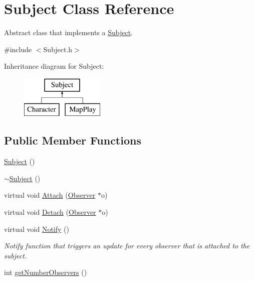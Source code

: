 \hypertarget{class_subject}{}\section{Subject Class Reference}
\label{class_subject}


Abstract class that implements a \hyperlink{class_subject}{Subject}.  




{\ttfamily \#include $<$Subject.\+h$>$}

Inheritance diagram for Subject\+:\begin{figure}[H]
\begin{center}
\leavevmode
\includegraphics[height=2.000000cm]{class_subject}
\end{center}
\end{figure}
\subsection*{Public Member Functions}
\begin{DoxyCompactItemize}
\item 
\hyperlink{class_subject_ab468044832c824c6d6c2f46272655207}{Subject} ()
\item 
\hyperlink{class_subject_a7c4f522850f718466e5be7eb55ba1969}{$\sim$\+Subject} ()
\item 
virtual void \hyperlink{class_subject_a4178d3cef008c713370791c6578334de}{Attach} (\hyperlink{class_observer}{Observer} $\ast$o)
\item 
virtual void \hyperlink{class_subject_ac839596fe840efb970e36a66554e3095}{Detach} (\hyperlink{class_observer}{Observer} $\ast$o)
\item 
\hypertarget{class_subject_afdf01736ff099d286543b450d96215f1}{}\label{class_subject_afdf01736ff099d286543b450d96215f1} 
virtual void \hyperlink{class_subject_afdf01736ff099d286543b450d96215f1}{Notify} ()
\begin{DoxyCompactList}\small\item\em Notify function that triggers an update for every observer that is attached to the subject. \end{DoxyCompactList}\item 
int \hyperlink{class_subject_a606f81da175e7ba807ed72482e4435bf}{get\+Number\+Observers} ()
\end{DoxyCompactItemize}


